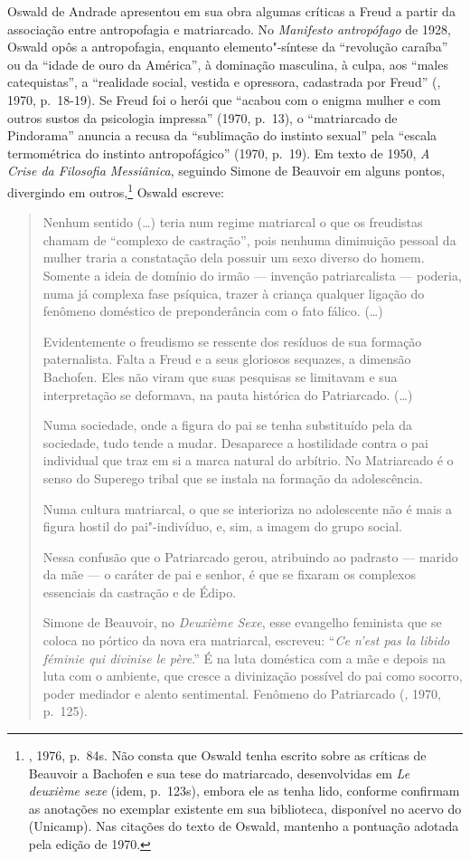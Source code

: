 Oswald de Andrade apresentou em sua obra algumas críticas a Freud a
partir da associação entre antropofagia e matriarcado. No
\emph{Manifesto antropófago} de 1928, Oswald opôs a antropofagia,
enquanto elemento"-síntese da ``revolução caraíba'' ou da ``idade de ouro
da América'', à dominação masculina, à culpa, aos ``males catequistas'',
a ``realidade social, vestida e opressora, cadastrada por
Freud'' (, 1970, p.~18-19). Se Freud foi o herói que
``acabou com o enigma mulher e com outros sustos da psicologia
impressa'' (1970, p.~13), o ``matriarcado de Pindorama'' anuncia
a recusa da ``sublimação do instinto sexual'' pela ``escala termométrica
do instinto antropofágico'' (1970, p.~19). Em texto de 1950,
\emph{A Crise da Filosofia Messiânica}, seguindo Simone de Beauvoir em
alguns pontos, divergindo em outros,\footnote{, 1976, p.~84s.
  Não consta que Oswald tenha escrito sobre as críticas de Beauvoir a
  Bachofen e sua tese do matriarcado, desenvolvidas em \emph{Le deuxième
  sexe} (idem, p.~123s), embora ele as tenha lido, conforme confirmam as
  anotações no exemplar existente em sua biblioteca, disponível no
  acervo do  (Unicamp). Nas citações do texto de Oswald, mantenho a
  pontuação adotada pela edição de 1970.} Oswald escreve:

\begin{quote}
Nenhum sentido (\ldots{}) teria num regime matriarcal o que os freudistas
chamam de ``complexo de castração'', pois nenhuma diminuição pessoal da
mulher traria a constatação dela possuir um sexo diverso do homem.
Somente a ideia de domínio do irmão --- invenção patriarcalista ---
poderia, numa já complexa fase psíquica, trazer à criança qualquer
ligação do fenômeno doméstico de preponderância com o fato fálico. (\ldots{})

Evidentemente o freudismo se ressente dos resíduos de sua formação
paternalista. Falta a Freud e a seus gloriosos sequazes, a dimensão
Bachofen. Eles não viram que suas pesquisas se limitavam e sua
interpretação se deformava, na pauta histórica do Patriarcado. (\ldots{})

Numa sociedade, onde a figura do pai se tenha substituído pela da
sociedade, tudo tende a mudar. Desaparece a hostilidade contra o pai
individual que traz em si a marca natural do arbítrio. No Matriarcado é
o senso do Superego tribal que se instala na formação da adolescência.

Numa cultura matriarcal, o que se interioriza no adolescente não é mais
a figura hostil do pai"-indivíduo, e, sim, a imagem do grupo social.

Nessa confusão que o Patriarcado gerou, atribuindo ao padrasto --- marido
da mãe --- o caráter de pai e senhor, é que se fixaram os complexos
essenciais da castração e de Édipo.

Simone de Beauvoir, no \emph{Deuxième Sexe}, esse evangelho feminista
que se coloca no pórtico da nova era matriarcal, escreveu: ``\emph{Ce
n'est pas la libido féminie qui divinise le père}.'' É na luta doméstica
com a mãe e depois na luta com o ambiente, que cresce a divinização
possível do pai como socorro, poder mediador e alento sentimental.
Fenômeno do Patriarcado (, 1970, p.~125).
\end{quote}

